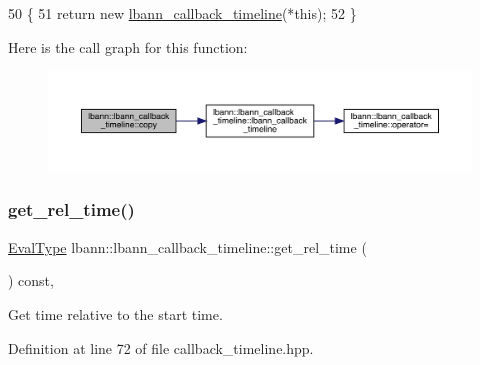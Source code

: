 \begin{DoxyCode}
50                                                  \{
51     \textcolor{keywordflow}{return} \textcolor{keyword}{new} \hyperlink{classlbann_1_1lbann__callback__timeline_a51afde4e9dbd97ecb1d40071df16fb78}{lbann\_callback\_timeline}(*\textcolor{keyword}{this});
52   \}
\end{DoxyCode}
Here is the call graph for this function\+:\nopagebreak
\begin{figure}[H]
\begin{center}
\leavevmode
\includegraphics[width=350pt]{classlbann_1_1lbann__callback__timeline_aa1359380162f29838be3cdb0bb25b3e3_cgraph}
\end{center}
\end{figure}
\mbox{\label{classlbann_1_1lbann__callback__timeline_a67da1376356bf2153ab67489014e0ad4}} 
\subsubsection{\texorpdfstring{get\+\_\+rel\+\_\+time()}{get\_rel\_time()}}
{\footnotesize\ttfamily \hyperlink{base_8hpp_a3266f5ac18504bbadea983c109566867}{Eval\+Type} lbann\+::lbann\+\_\+callback\+\_\+timeline\+::get\+\_\+rel\+\_\+time (\begin{DoxyParamCaption}{ }\end{DoxyParamCaption}) const\hspace{0.3cm}{\ttfamily [inline]}, {\ttfamily [private]}}



Get time relative to the start time. 



Definition at line 72 of file callback\+\_\+timeline.\+hpp.


